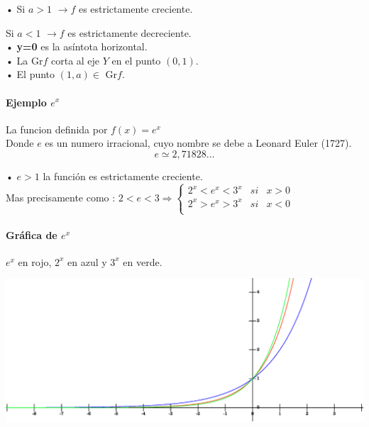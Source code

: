 \qquad •  Si $a>1$ $\longrightarrow f$ es estrictamente creciente.

\qquad \quad Si $a<1$ $\longrightarrow f$ es estrictamente decreciente.\\

\qquad •  \textbf{y=0} es la asíntota horizontal.\\

\qquad •  La Gr$f$ corta al eje $Y$ en el punto $(0,1)$.\\

\qquad •  El punto $(1, a) \in $ Gr$f$.

\paragraph{Ejemplo $e^x$}

La funcion definida por $f(x)=e^x$\\

Donde $e$ es un numero irracional, cuyo nombre se debe a Leonard Euler (1727).\\
$$e \simeq 2,71828\ldots$$

\qquad •  $e>1$ la función es estrictamente creciente.\\

Mas precisamente como : $2<e<3 \Rightarrow
\left\{
\begin{array}{ccc}
2^x<e^x<3^x & si & x>0 \\
2^x > e^x >3^x & si & x<0\\
\end{array}\right.$


\paragraph{Gráfica de $e^x$}
\begin{center}

$e^x$ en rojo, $2^x$ en azul y $3^x$ en verde.\\
\includegraphics[height=6cm,width=16cm]{fexp.eps}

\end{center}


